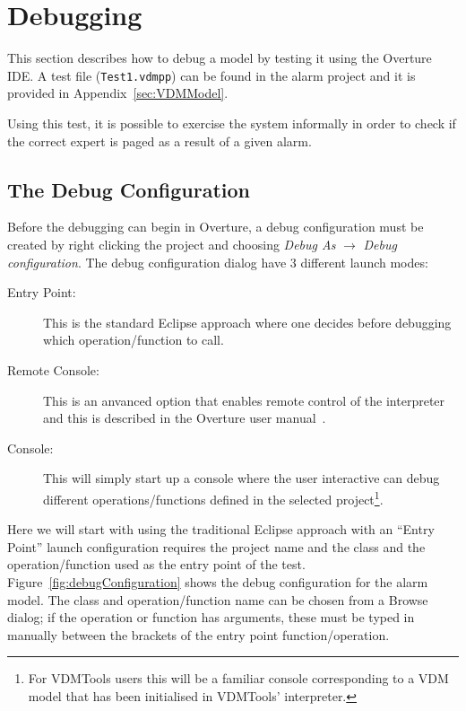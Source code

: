 \section{Debugging}\label{sec:debugging}

This section describes how to debug a model by testing it using the
Overture IDE. A test file (\texttt{Test1.vdmpp}) can be
found in the alarm project and it is provided in
Appendix~\ref{sec:VDMModel}.

\lstset{language=VDM++}
%

Using this test, it is possible to exercise the system informally in
order to check if the correct expert is paged as a result of a given
alarm.


\subsection{The Debug Configuration}

Before the debugging can begin in Overture, a debug configuration must
be created by right clicking the project and choosing \emph{Debug As}
$ \rightarrow $ \emph{Debug configuration}.
The debug configuration
dialog have 3 different launch modes:

\begin{description}
\item[Entry Point:] This is the standard Eclipse approach where one
  decides before debugging which operation/function to call.
\item[Remote Console:] This is an anvanced option that enables remote
  control of the interpreter and this is described in the Overture
  user manual~\cite{Larsen&10d}.
\item[Console:] This will simply start up a console where the user
  interactive can debug different operations/functions defined in the
  selected project\footnote{For VDMTools users this will be a familiar
    console corresponding to a VDM model that has been initialised in
    VDMTools' interpreter.}.
\end{description}

Here we will start with using 
the traditional Eclipse approach with an ``Entry Point'' launch
configuration requires the project name and the class and the operation/function
used as the entry point of the test.  Figure~\ref{fig:debugConfiguration}
shows the debug configuration for the alarm model. The class and
operation/function name can be chosen from a Browse dialog; if the
operation or function has arguments, these must be typed in manually
between the brackets of the entry point
function/operation.

